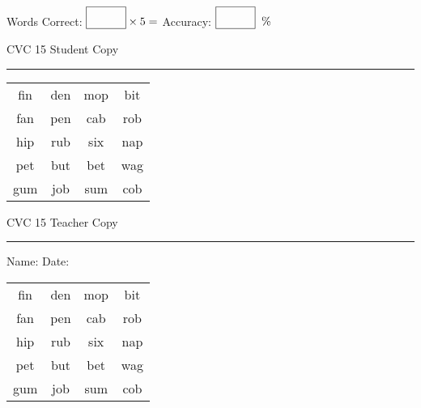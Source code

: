 \documentclass{memoir}
\begin{document}
\small

Words Correct: $\fbox{\phantom{\huge 100}} \times 5 = $ Accuracy: $\fbox{\phantom{\huge 100}}\;\; \%$ 

\vfill

\newpage


\footnotesize \noindent
CVC 15 \hfill Student Copy
\smallskip
\hrule

\Large

\setlength{\tabcolsep}{14pt}
\def\arraystretch{2}

{\selectfont


\begin{vplace}[0.5]
\begin{center}
\begin{tabular}{cccc}
fin & den & mop & bit \\
fan & pen & cab & rob \\
hip & rub & six & nap \\
pet & but & bet & wag \\
gum  & job & sum & cob \\
\end{tabular}
\end{center}
\end{vplace}

}

\newpage

\footnotesize \noindent
CVC 15 \hfill Teacher Copy
\smallskip
\hrule

\small

\vfill

\noindent
Name: \underline{\hspace{1.75in}} \hfill Date: \underline{\hspace{1in}}

\Large

{\selectfont


\begin{vplace}[0.5]
\begin{center}
\begin{tabular}{cccc}
fin & den & mop & bit \\
fan & pen & cab & rob \\
hip & rub & six & nap \\
pet & but & bet & wag \\
gum  & job & sum & cob \\
\end{tabular}
\end{center}
\end{vplace}



}
\end{document}

